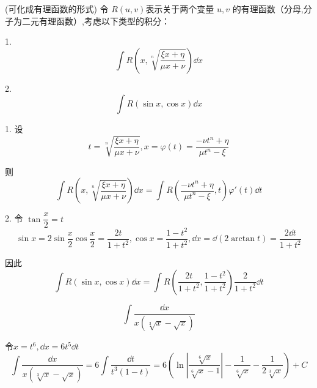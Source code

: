 \begin{problem}
	(可化成有理函数的形式)
	令 \( R(u, v) \)表示关于两个变量 \( u, v \) 的有理函数（分母,分子为二元有理函数）,考虑以下类型的积分：
	
	1.
	\[
	\int R\left(x, \sqrt[n]{\frac{\xi x+\eta}{\mu x+\nu}}\right) \dd x
	\]
	
	2.
	\[
	\int R(\sin x, \cos x) \dd x
	\] 
	
\end{problem}
\begin{solution}
	
	1. 设
	\[
	t = \sqrt[n]{\frac{\xi x+\eta}{\mu x+\nu}}, x = \varphi(t) = \frac{-\nu t^n + \eta}{\mu t^n - \xi}
	\]
	
	则
	\[
	\int R\left(x, \sqrt[n]{\frac{\xi x+\eta}{\mu x+\nu}}\right) \dd x = \int R\left(\frac{-\nu t^n + \eta}{\mu t^n - \xi}, t\right) \varphi'(t) \dd t
	\]
	
	2. 令 \(\tan \dfrac{x}{2} = t\)
	\[
	\sin x = 2 \sin \frac{x}{2} \cos \frac{x}{2} = \frac{2t}{1 + t^2}, \cos x = \frac{1 - t^2}{1 + t^2},  \dd x = \dd(2 \arctan t) = \frac{2 \dd t}{1 + t^2}
	\]
	
	因此
	\[
	\int R(\sin x, \cos x) \dd x = \int R\left(\frac{2t}{1 + t^2}, \frac{1 - t^2}{1 + t^2}\right) \frac{2}{1 + t^2} \dd t
	\]
\end{solution}
\begin{problem}
	\[\int \frac{\dd x}{x(\sqrt[3]{x}-\sqrt{x})}\]
\end{problem}

\begin{solution}
	令$x=t^6,\dd x=6t^5\dd t$
	\[\int \frac{\dd x}{x(\sqrt[3]{x}-\sqrt{x})}=6\int \frac{\dd t}{t^3(1-t)}=6(\ln|\frac{\sqrt[6]{x}}{\sqrt[6]{x}-1}|-\frac{1}{\sqrt[6]{x}}-\frac{1}{2\sqrt[3]{x}})+C\]
\end{solution}

